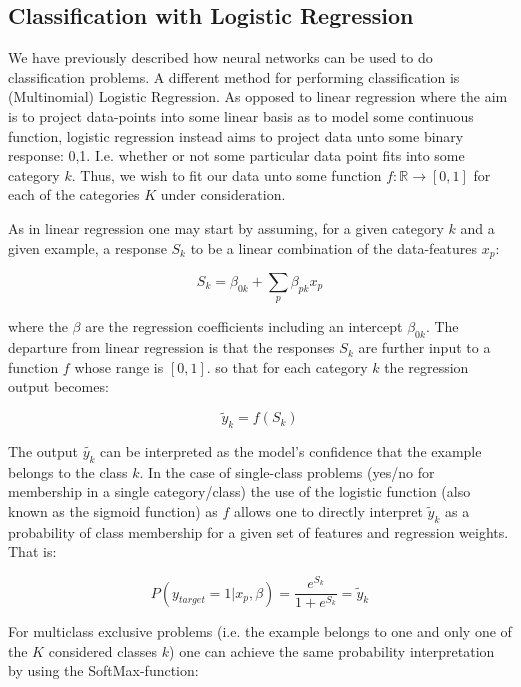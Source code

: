 \documentclass[reprint, english, nofootinbib]{revtex4-2}
\begin{document}
\subsection{Classification with Logistic Regression}
\noindent

We have previously described how neural networks can be used to do classification problems. A different method for performing classification is (Multinomial) Logistic Regression. As opposed to linear regression where the aim is to project data-points into some linear basis as to model some continuous function, logistic regression instead aims to project data unto some binary response: 0,1. I.e. whether or not some particular data point fits into some category $k$. Thus, we wish to fit our data unto some function $f : \mathbb R \rightarrow [0, 1]$ for each of the categories $K$ under consideration.

As in linear regression one may start by assuming, for a given category $k$ and a given example, a response $S_k$ to be a linear combination of the data-features $x_{p}$:

\begin{equation}
\label{eq:logreg_input}
S_k = \beta_{0k} + \sum_p \beta_{pk}  x_p
\end{equation}

where the $\beta$ are the regression coefficients including an intercept $\beta_{0k}$. The departure from linear regression is that the responses $S_k$ are further input to a function $f$ whose range is $[0,1]$. so that for each category $k$ the regression output becomes:

\begin{equation}
\label{eq:logreg_output}
\tilde{y}_k = f(S_k)
\end{equation}

The output $\tilde{y_k}$ can be interpreted as the model's confidence that the example belongs to the class $k$. In the case of single-class problems (yes/no for membership in a single category/class) the use of the logistic function (also known as the sigmoid function) as $f$ allows one to directly interpret $\tilde{y}_k$ as a probability of class membership for a given set of features and regression weights. That is:

\begin{equation}
\label{eq:single_class_prob}
P(y_{target} = 1 | x_p, \beta) = \frac{e^{S_k}}{1+e^{S_k}} = \tilde{y}_k
\end{equation}

For multiclass exclusive problems (i.e. the example belongs to one and only one of the $K$ considered classes $k$) one can achieve the same probability interpretation by using the SoftMax-function:
\end{document}
